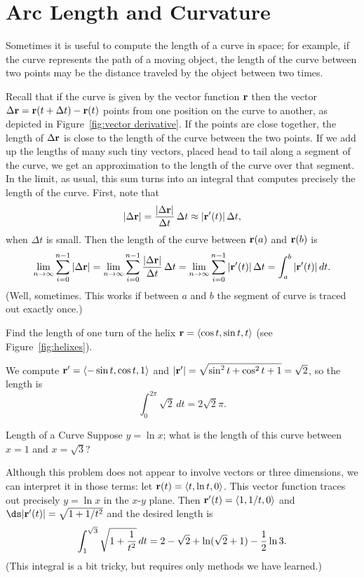 \section{Arc Length and Curvature}\label{sec:arc length 3D}

Sometimes it is useful to compute the length of a curve in space; for
example, if the curve represents the path of a moving object, the
length of the curve between two points may be the distance traveled by
the object between two times.

Recall that if the curve is given by the vector function $\bf r$ then
the vector $\Delta {\bf r}=
{\bf r}(t+\Delta t)-{\bf r}(t)$ points from one position
on the curve to another, as depicted in Figure~\ref{fig:vector derivative}.
If the points are close together, the length of 
$\Delta {\bf r}$ is close to the length of the
curve between the two points. If we add up the lengths of many such
tiny vectors, placed head to tail along a segment of the curve, we get
an approximation to the length of the curve over that segment. In the
limit, as usual, this sum turns into an integral that computes precisely
the length of the curve. 
First, note that 
$$|\Delta {\bf r}|={|\Delta {\bf r}|\over \Delta t}\,\Delta t\approx
|{\bf r}'(t)|\,\Delta t,$$
when $\Delta t$ is small.
Then the length of the curve between
${\bf r}(a)$ and ${\bf r}(b)$ is 
$$\lim_{n\to\infty} \sum_{i=0}^{n-1}|\Delta {\bf r}|
=\lim_{n\to\infty} \sum_{i=0}^{n-1} {|\Delta {\bf r}|\over \Delta t}\,\Delta t
=\lim_{n\to\infty} \sum_{i=0}^{n-1} |{\bf r}'(t)|\,\Delta t=
\int_a^b|{\bf r}'(t)|\,dt.$$
(Well, sometimes. This works if between $a$ and $b$ the segment of curve
is traced out exactly once.)

\begin{example}{}{}
Find the length of one turn of the helix
${\bf r}=\langle \cos t, \sin t, t\rangle$ (see Figure~\ref{fig:helixes}).
\end{example}
\begin{solution}
We compute ${\bf r}'=\langle -\sin t, \cos t, 1\rangle$ and
$|{\bf r}'|=\sqrt{\sin^2 t+\cos^2 t+1}=\sqrt2$, so the length is
$$\int_0^{2\pi} \sqrt2\,dt = 2\sqrt2\pi.$$
\end{solution}

\begin{example}{Length of a Curve}{}
Suppose $y=\ln x$; what is the length of this curve between
$x=1$ and $x=\sqrt3$?
\end{example}
\begin{solution}
Although this problem does not appear to involve vectors or three
dimensions, we can interpret it in those terms: let 
${\bf r}(t)=\langle t,\ln t,0\rangle$. This vector function traces
out precisely $y=\ln x$ in the $x$-$y$ plane. Then 
${\bf r}'(t)=\langle 1,1/t,0\rangle$ and
$\ds |{\bf r}'(t)|=\sqrt{1+1/t^2}$ and the desired length is
$$\int_1^{\sqrt3} \sqrt{1+{1\over
    t^2}}\,dt=2-\sqrt2+\ln(\sqrt2+1)-{1\over2}\ln3.$$
(This integral is a bit tricky, but requires only methods we have
learned.) 
\end{solution}


